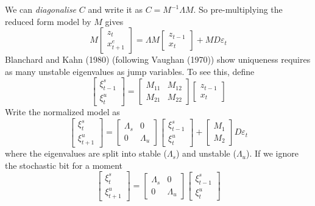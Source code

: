 \documentclass[
  letterpaper,
]{book}
\begin{document}
We can \emph{diagonalise} \(C\) and write it as \(C=M^{-1}\Lambda M\).
So pre-multiplying the reduced form model by \(M\) gives \[ 
M \begin{bmatrix} z_t \\ x_{t+1}^e \end{bmatrix} = \Lambda M \begin{bmatrix} z_{t-1} \\ x_t \end{bmatrix} + M D \varepsilon_t
\] Blanchard and Kahn (1980) (following
Vaughan (1970)) show uniqueness requires as many unstable eigenvalues as
jump variables. To see this, define \[
\begin{bmatrix} \xi_{t-1}^{s} \\  \xi_t^{u} \end{bmatrix}
  =  \begin{bmatrix} M_{11} & M_{12} \\  M_{21} & M_{22} \end{bmatrix}
      \begin{bmatrix} z_{t-1} \\  x_t \end{bmatrix}
\] Write the normalized model as \[
\begin{bmatrix} \xi_t^s \\ \xi_{t+1}^u \end{bmatrix}
 = \begin{bmatrix} \Lambda_s & 0 \\ 0 & \Lambda_u \end{bmatrix} 
\begin{bmatrix} \xi_{t-1}^s \\ \xi_t^u \end{bmatrix} +
\begin{bmatrix} M_1 \\ M_2 \end{bmatrix} D\varepsilon_t
\] where the eigenvalues are split into stable (\(\Lambda_s\)) and
unstable (\(\Lambda_u\)). If we ignore the stochastic bit for a moment
\[
\begin{bmatrix} \xi_t^s \\ \xi_{t+1}^u \end{bmatrix}
 = \begin{bmatrix} \Lambda_s & 0 \\ 0 & \Lambda_u \end{bmatrix} 
\begin{bmatrix} \xi_{t-1}^s \\ \xi_t^u \end{bmatrix}
\]
\end{document}
